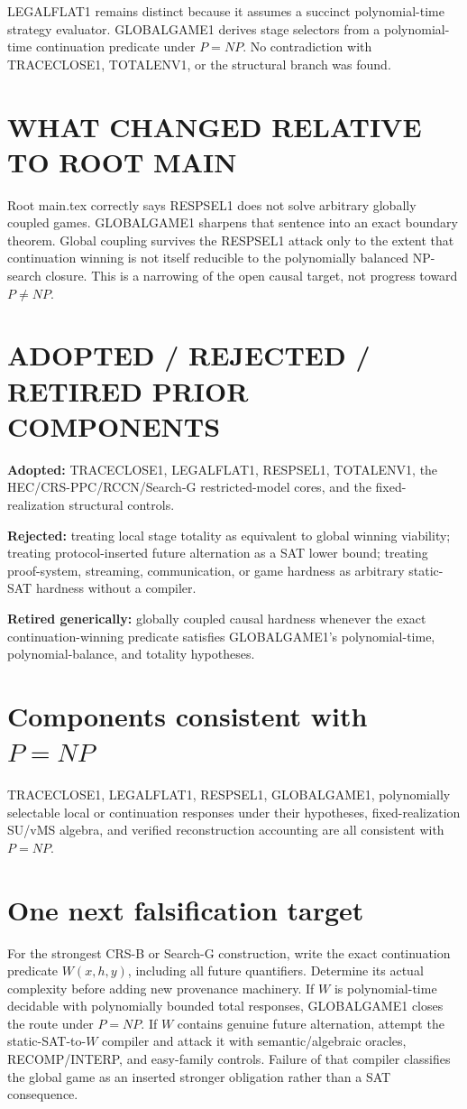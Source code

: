 \documentclass[11pt]{article}
\begin{document}
LEGALFLAT1 remains distinct because it assumes a succinct polynomial-time strategy evaluator. GLOBALGAME1 derives stage selectors from a polynomial-time continuation predicate under \(P=NP\). No contradiction with TRACECLOSE1, TOTALENV1, or the structural branch was found.

\section*{WHAT CHANGED RELATIVE TO ROOT MAIN}
Root main.tex correctly says RESPSEL1 does not solve arbitrary globally coupled games. GLOBALGAME1 sharpens that sentence into an exact boundary theorem. Global coupling survives the RESPSEL1 attack only to the extent that continuation winning is not itself reducible to the polynomially balanced NP-search closure. This is a narrowing of the open causal target, not progress toward \(P\ne NP\).

\section*{ADOPTED / REJECTED / RETIRED PRIOR COMPONENTS}
\textbf{Adopted:} TRACECLOSE1, LEGALFLAT1, RESPSEL1, TOTALENV1, the HEC/CRS-PPC/RCCN/Search-G restricted-model cores, and the fixed-realization structural controls.

\textbf{Rejected:} treating local stage totality as equivalent to global winning viability; treating protocol-inserted future alternation as a SAT lower bound; treating proof-system, streaming, communication, or game hardness as arbitrary static-SAT hardness without a compiler.

\textbf{Retired generically:} globally coupled causal hardness whenever the exact continuation-winning predicate satisfies GLOBALGAME1's polynomial-time, polynomial-balance, and totality hypotheses.

\section*{Components consistent with \(P=NP\)}
TRACECLOSE1, LEGALFLAT1, RESPSEL1, GLOBALGAME1, polynomially selectable local or continuation responses under their hypotheses, fixed-realization SU/vMS algebra, and verified reconstruction accounting are all consistent with \(P=NP\).

\section*{One next falsification target}
For the strongest CRS-B or Search-G construction, write the exact continuation predicate \(W(x,h,y)\), including all future quantifiers. Determine its actual complexity before adding new provenance machinery. If \(W\) is polynomial-time decidable with polynomially bounded total responses, GLOBALGAME1 closes the route under \(P=NP\). If \(W\) contains genuine future alternation, attempt the static-SAT-to-\(W\) compiler and attack it with semantic/algebraic oracles, RECOMP/INTERP, and easy-family controls. Failure of that compiler classifies the global game as an inserted stronger obligation rather than a SAT consequence.
\end{document}
